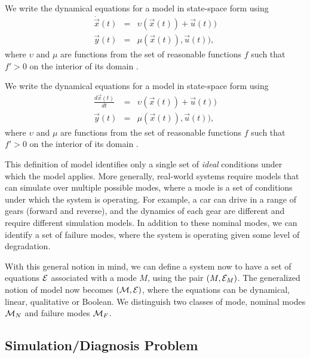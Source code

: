 \begin{definition}
We write the dynamical equations for a model in state-space form using
\begin{eqnarray}\label{qual-model}
\dot{\vec{x}}(t) & = & \upsilon (\vec{x}(t)) + \vec{u}(t))\\
\vec{y}(t) & = & \mu (\vec{x}(t)), \vec{u}(t)),
\end{eqnarray}
where $\upsilon$ and $\mu$ are  functions from the set of reasonable functions $f$ such that $f' > 0$ on the interior of its domain \citep{kuipers1994composition}.
\end{definition}

\begin{definition}
We write the dynamical equations for a model in state-space form using
\begin{eqnarray}\label{boolean-model}
\frac{d \vec{x}(t)}{dt} & = & \upsilon (\vec{x}(t)) + \vec{u}(t))\\
\vec{y}(t) & = & \mu (\vec{x}(t)), \vec{u}(t)),
\end{eqnarray}
where $\upsilon$ and $\mu$ are  functions from the set of reasonable functions $f$ such that $f' > 0$ on the interior of its domain \citep{kuipers1994composition}.
\end{definition}

This definition of model identifies only a single set of \textit{ideal} conditions under which the model applies. More generally, real-world systems require models that can simulate over multiple possible modes, where a mode is a set of conditions under which the system is operating. For example, a car can drive in a range of gears (forward and reverse), and the dynamics of each gear are different and require different simulation models. In addition to these nominal modes, we can identify a set of failure modes, where the system is operating given some level of degradation. 

With this general notion in mind, we can define a system now to have a set of equations $\cal E$ associated with a mode $M$, using the pair $(M,{\cal E}_M)$. The generalized notion of model now becomes $({\cal M},{\cal E})$, where the equations can be dynamical, linear, qualitative or Boolean.
We distinguish two classes of mode, nominal modes ${\cal M}_N$ and failure modes ${\cal M}_F$.


\subsection{Simulation/Diagnosis Problem}

